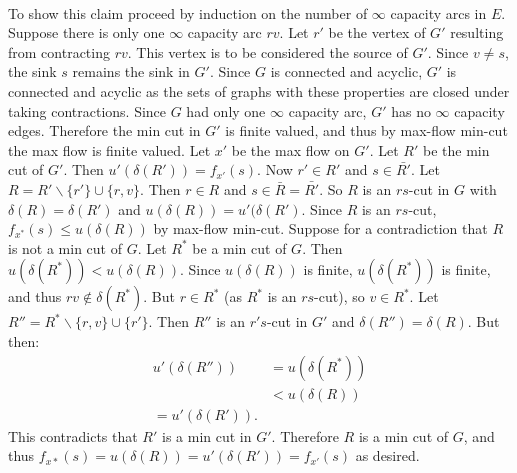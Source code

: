 \documentclass[letterpaper,12pt,oneside,onecolumn]{article}
\begin{document}
\paragraph{}
To show this claim proceed by induction on the number of $\infty$ capacity arcs in $E$. Suppose there is only one $\infty$ capacity arc $rv$. Let $r'$ be the vertex of $G'$ resulting from contracting $rv$. This vertex is to be considered the source of $G'$. Since $v\neq s$, the sink $s$ remains the sink in $G'$. Since $G$ is connected and acyclic, $G'$ is connected and acyclic as the sets of graphs with these properties are closed under taking contractions. Since $G$ had only one $\infty$ capacity arc, $G'$ has no $\infty$ capacity edges. Therefore the min cut in $G'$ is finite valued, and thus by max-flow min-cut the max flow is finite valued. Let $x'$ be the max flow on $G'$. Let $R'$ be the min cut of $G'$. Then $u'(\delta(R')) = f_{x'}(s)$. Now $r' \in R'$ and $s \in \bar{R'}$. Let $R = R' \backslash\{r'\} \cup \{r,v\}$. Then $r \in R$ and $s \in \bar{R} = \bar{R'}$. So $R$ is an $rs$-cut in $G$ with $\delta(R) = \delta(R')$ and $u(\delta(R)) = u'(\delta(R')$. Since $R$ is an $rs$-cut, $f_{x^*}(s) \leq u(\delta(R))$ by max-flow min-cut. Suppose for a contradiction that $R$ is not a min cut of $G$. Let $R^*$ be a min cut of $G$. Then $u(\delta(R^*)) < u(\delta(R))$. Since $u(\delta(R))$ is finite, $u(\delta(R^*))$ is finite, and thus $rv \not\in \delta(R^*)$. But $r \in R^*$ (as $R^*$ is an $rs$-cut), so $v \in R^*$. Let $R'' = R^* \backslash \{r,v\} \cup \{r'\}$. Then $R''$ is an $r's$-cut in $G'$ and $\delta(R'') = \delta(R)$. But then:
\begin{align*}
u'(\delta(R'')) &= u(\delta(R^*)) \\
&< u(\delta(R)) \\
= u'(\delta(R')).
\end{align*}
This contradicts that $R'$ is a min cut in $G'$. Therefore $R$ is a min cut of $G$, and thus $f_{x*}(s) = u(\delta(R)) = u'(\delta(R')) = f_{x'}(s)$ as desired.
\end{document}
